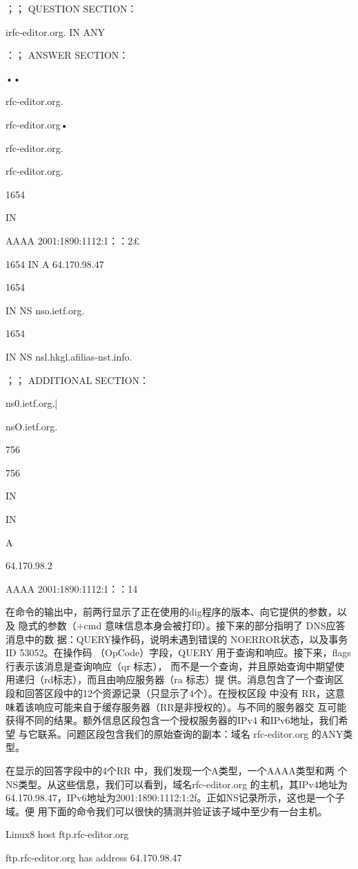 ；； QUESTION SECTION：

irfc-editor.org. IN ANY

：； ANSWER SECTION：

••

rfc-editor.org.

rfc-editor.org•

rfc-editor.org.

rfc-editor.org.

1654

IN

AAAA 2001:1890:1112:1：：2£

1654 IN A 64.170.98.47

1654

IN NS nso.ietf.org.

1654

IN NS nsl.hkgl.afilias-nst.info.

；； ADDITIONAL SECTION：

ns0.ietf.org.|

nsO.ietf.org.

756

756

IN

IN

A

64.170.98.2

AAAA 2001:1890:1112:1：：14

在命令的输出中，前两行显示了正在使用的dig程序的版本、向它提供的参数，以及
隐式的参数（+cmd 意味信息本身会被打印）。接下来的部分指明了 DNS应答消息中的数
据：QUERY操作码，说明未遇到错误的 NOERROR状态，以及事务 ID 53052。在操作码
（OpCode）字段，QUERY 用于查询和响应。接下来，flags 行表示该消息是查询响应（qr 标志），
而不是一个查询，并且原始查询中期望使用递归（rd标志），而且由响应服务器（ra 标志）提
供。消息包含了一个查询区段和回答区段中的12个资源记录（只显示了4个）。在授权区段
中没有 RR，这意味着该响应可能来自于缓存服务器（RR是非授权的）。与不同的服务器交
互可能获得不同的结果。额外信息区段包含一个授权服务器的IPv4 和IPv6地址，我们希望
与它联系。问题区段包含我们的原始查询的副本：域名 rfc-editor.org 的ANY类型。

在显示的回答字段中的4个RR 中，我们发现一个A类型，一个AAAA类型和两
个NS类型。从这些信息，我们可以看到，域名rfc-editor.org 的主机，其IPv4地址为
64.170.98.47，IPv6地址为2001:1890:1112:1:2f。正如NS记录所示，这也是一个子域。便
用下面的命令我们可以很快的猜测并验证该子域中至少有一台主机。

Linux8 host ftp.rfc-editor.org

ftp.rfc-editor.org has address 64.170.98.47

